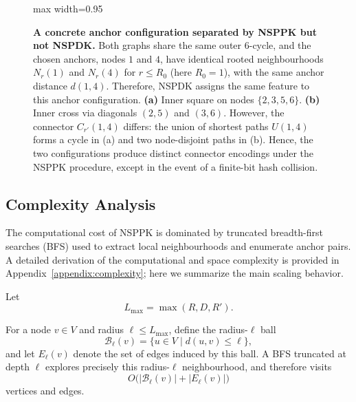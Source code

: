 \begin{figure}[t]
\begin{adjustbox}{max width=0.95\linewidth}
  \end{adjustbox}

\caption{\textbf{A concrete anchor configuration separated by NSPPK but not NSPDK.}
Both graphs share the same outer 6-cycle, and the chosen anchors, nodes $1$ and
$4$, have identical rooted neighbourhoods $N_r(1)$ and $N_r(4)$ for
$r\le R_0$ (here $R_0=1$), with the same anchor distance $d(1,4)$.
Therefore, NSPDK assigns the same feature to this anchor configuration.
\textbf{(a)} Inner square on nodes $\{2,3,5,6\}$.
\textbf{(b)} Inner cross via diagonals $(2,5)$ and $(3,6)$.
However, the connector $C_{r'}(1,4)$ differs: the union of shortest paths
$U(1,4)$ forms a cycle in (a) and two node-disjoint paths in (b). Hence, the two configurations produce distinct connector encodings under the
NSPPK procedure, except in the event of a finite-bit hash collision.}
\label{fig:nsppk-vs-nspdk-hexagon}
\end{figure}
\subsection{Complexity Analysis}
\label{sec:complexity}

The computational cost of NSPPK is dominated by truncated breadth-first
searches (BFS) used to extract local neighbourhoods and enumerate anchor pairs.
A detailed derivation of the computational and space complexity is provided in
Appendix~\ref{appendix:complexity}; here we summarize the main scaling behavior.

Let
\[
L_{\max}=\max(R,D,R').
\]

For a node $v\in V$ and radius $\ell\le L_{\max}$, define the radius-$\ell$
ball
\[
\mathcal{B}_\ell(v)=\{u\in V \mid d(u,v)\le \ell\},
\]
and let $E_\ell(v)$ denote the set of edges induced by this ball.
A BFS truncated at depth $\ell$ explores precisely this radius-$\ell$
neighbourhood, and therefore visits
\[
O\bigl(|\mathcal{B}_\ell(v)| + |E_\ell(v)|\bigr)
\]
vertices and edges.

